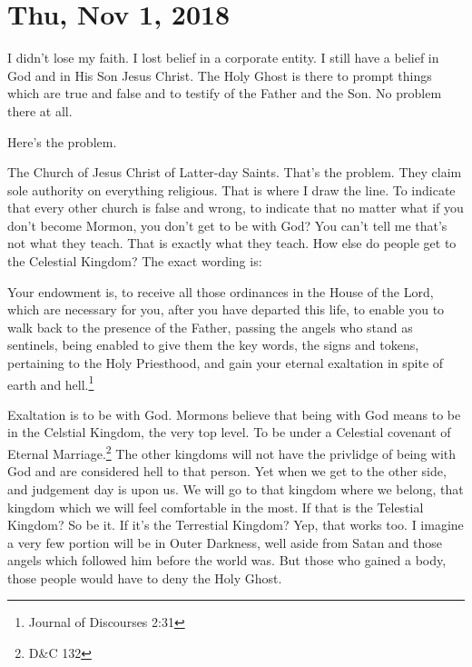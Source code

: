 \section{Thu, Nov 1, 2018}

I didn't lose my faith. I lost belief in a corporate entity. I still have a belief in
God and in His Son Jesus Christ. The Holy Ghost is there to prompt things which are
true and false and to testify of the Father and the Son. No problem there at all.

Here's the problem.

The Church of Jesus Christ of Latter-day Saints. That's the problem. They claim sole
authority on everything religious. That is where I draw the line. To indicate that
every other church is false and wrong, to indicate that no matter what if you don't
become Mormon, you don't get to be with God? You can't tell me that's not what they
teach. That is exactly what they teach. How else do people get to the Celestial
Kingdom? The exact wording is:

\begin{displayquote}
Your endowment is, to receive all those ordinances in the House of the
Lord, which are necessary for you, after you have departed this life, to enable you 
to walk back to the presence of the Father, passing the angels who stand as 
sentinels, being enabled to give them the key words, the signs and tokens, 
pertaining to the Holy Priesthood, and gain your eternal exaltation in spite of 
earth and hell.\footnote{Journal of Discourses 2:31}
\end{displayquote}

Exaltation is to be with God. Mormons believe that being with God means to be in the
Celstial Kingdom, the very top level. To be under a Celestial covenant of Eternal
Marriage.\footnote{D\&C 132} The other kingdoms will not have the privlidge of being
with God and are considered hell to that person. Yet when we get to the other side,
and judgement day is upon us. We will go to that kingdom where we belong, that
kingdom which we will feel comfortable in the most. If that is the Telestial Kingdom?
So be it. If it's the Terrestial Kingdom? Yep, that works too. I imagine a very few
portion will be in Outer Darkness, well aside from Satan and those angels which
followed him before the world was. But those who gained a body, those people would
have to deny the Holy Ghost.
